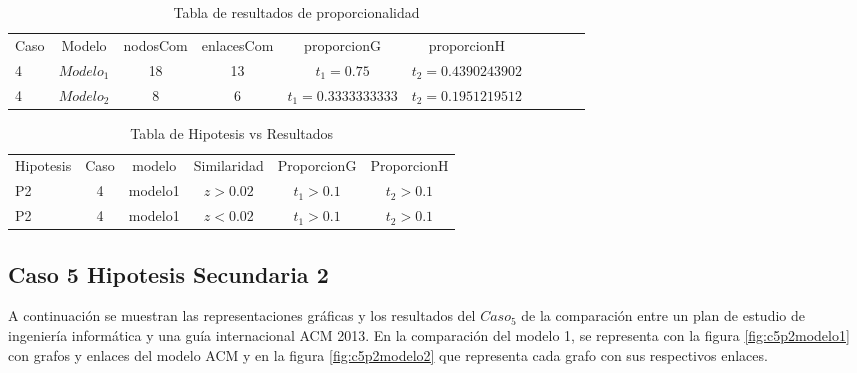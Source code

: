 \begin{table}[H]
\centering
\caption{Tabla de resultados de proporcionalidad}
\begin{tabular}[t]{lccccccccc}
\hline
Caso & Modelo & nodosCom & enlacesCom & proporcionG &proporcionH \\
4 & $Modelo_1$ & 18 & 13 & $t_1=0.75$ & $t_2=0.4390243902$\\
4 & $Modelo_2$ & 8 & 6 & $t_1=0.3333333333$ & $t_2=0.1951219512$\\
\hline
\end{tabular}
\label{tab:tabresultados2_C4_P2}
\end{table}

\begin{table}[H]
\centering
\caption{Tabla de Hipotesis vs Resultados }
\begin{tabular}[t]{lccccc}
\hline
Hipotesis & Caso & modelo & Similaridad & ProporcionG & ProporcionH\\
P2 & 4 & modelo1 &$z>0.02$&$t_1>0.1$&$t_2>0.1$\\
P2 & 4 & modelo1 &$z<0.02$&$t_1>0.1$&$t_2>0.1$\\
\hline
\end{tabular}
\label{tab:hipotesis_C4_P2}
\end{table}

\clearpage

\subsection{Caso 5 Hipotesis Secundaria 2}

A continuación se muestran las representaciones gráficas y los resultados del $Caso_5$ de la comparación entre un plan de estudio de ingeniería informática y una guía internacional ACM 2013. En la comparación del modelo 1, se representa con la figura \ref{fig:c5p2modelo1} con grafos y enlaces del modelo ACM y en la figura \ref{fig:c5p2modelo2} que representa cada grafo con sus respectivos enlaces. 

